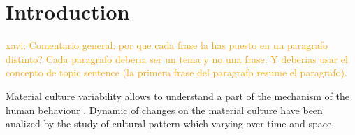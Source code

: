 \documentclass[review]{elsarticle}
\newcommand{\memo}[2]{\textcolor{#1}{#2}}
\newcommand{\xavi}[1]{\memo{orange}{xavi: #1\\}}
\begin{document}



\section{Introduction}

\xavi{Comentario general: por que cada frase la has puesto en un paragrafo distinto? Cada paragrafo deberia ser un tema y no una frase. Y deberias usar el concepto de topic sentence (la primera frase del paragrafo resume el paragrafo).}

Material culture variability allows to understand a part of the mechanism of the human behaviour \citep{basalla1988evolution}. Dynamic of changes on the material culture have been analized by the study of cultural pattern which varying over time and space \citep{eerkens_jelmer_cultural_2007, lycett_cultural_2015} %
\end{document}
